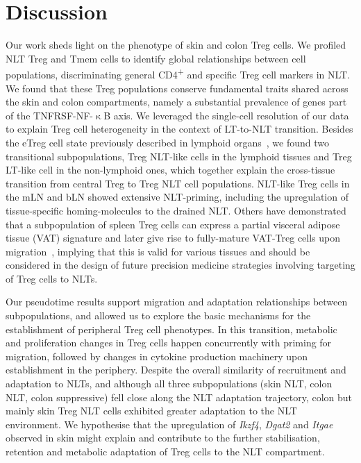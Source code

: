 \section{Discussion}
\label{section2.8}
Our work sheds light on the phenotype of skin and colon Treg cells. We profiled NLT Treg and Tmem cells to identify global relationships between cell populations, discriminating general CD4\textsuperscript{+} and specific Treg cell markers in NLT. We found that these Treg populations conserve fundamental traits shared across the skin and colon compartments, namely a substantial prevalence of genes part of the TNFRSF-NF-${\upkappa}$B axis.
We leveraged the single-cell resolution of our data to explain Treg cell heterogeneity in the context of LT-to-NLT transition. Besides the eTreg cell state previously described in lymphoid organs~\citep{Cretney2011-zd}, we found two transitional subpopulations, Treg NLT-like cells in the lymphoid tissues and Treg LT-like cell in the non-lymphoid ones, which together explain the cross-tissue transition from central Treg to Treg NLT cell populations. NLT-like Treg cells in the mLN and bLN showed extensive NLT-priming, including the upregulation of tissue-specific homing-molecules to the drained NLT. Others have demonstrated that a subpopulation of spleen Treg cells can express a partial visceral adipose tissue (VAT) signature and later give rise to fully-mature VAT-Treg cells upon migration~\citep{Li2018-xq}, implying that this is valid for various tissues and should be considered in the design of future precision medicine strategies involving targeting of Treg cells to NLTs.

Our pseudotime results support migration and adaptation relationships between subpopulations, and allowed us to explore the basic mechanisms for the establishment of peripheral Treg cell phenotypes. In this transition, metabolic and proliferation changes in Treg cells happen concurrently with priming for migration, followed by changes in cytokine production machinery upon establishment in the periphery. Despite the overall similarity of recruitment and adaptation to NLTs, and although all three subpopulations (skin NLT, colon NLT, colon suppressive) fell close along the NLT adaptation trajectory, colon but mainly skin Treg NLT cells exhibited greater adaptation to the NLT environment. We hypothesise that the upregulation of \textit{Ikzf4}, \textit{Dgat2} and \textit{Itgae} observed in skin might explain and contribute to the further stabilisation, retention and metabolic adaptation of Treg cells to the NLT compartment.

